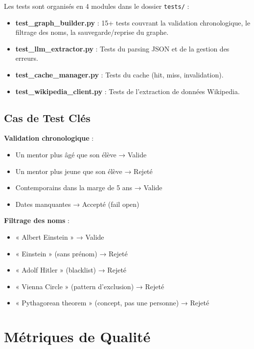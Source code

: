 \documentclass[12pt,a4paper]{report}
\begin{document}
Les tests sont organisés en 4 modules dans le dossier \texttt{tests/} :

\begin{itemize}
    \item \textbf{test\_graph\_builder.py} : 15+ tests couvrant la validation chronologique, le filtrage des noms, la sauvegarde/reprise du graphe.
    \item \textbf{test\_llm\_extractor.py} : Tests du parsing JSON et de la gestion des erreurs.
    \item \textbf{test\_cache\_manager.py} : Tests du cache (hit, miss, invalidation).
    \item \textbf{test\_wikipedia\_client.py} : Tests de l'extraction de données Wikipedia.
\end{itemize}

\subsection{Cas de Test Clés}

\textbf{Validation chronologique} :
\begin{itemize}
    \item Un mentor plus âgé que son élève → Valide
    \item Un mentor plus jeune que son élève → Rejeté
    \item Contemporains dans la marge de 5 ans → Valide
    \item Dates manquantes → Accepté (fail open)
\end{itemize}

\textbf{Filtrage des noms} :
\begin{itemize}
    \item « Albert Einstein » → Valide
    \item « Einstein » (sans prénom) → Rejeté
    \item « Adolf Hitler » (blacklist) → Rejeté
    \item « Vienna Circle » (pattern d'exclusion) → Rejeté
    \item « Pythagorean theorem » (concept, pas une personne) → Rejeté
\end{itemize}

\section{Métriques de Qualité}
\end{document}

